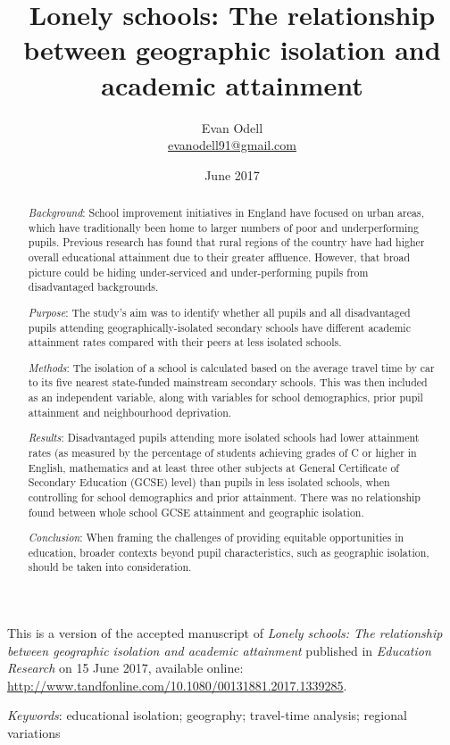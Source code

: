 \documentclass[12pt, a4paper]{article}
\title{{\Huge Lonely schools: The relationship between geographic isolation and academic attainment}}
\author{Evan Odell \\ \href{mailto: evanodell91@gmail.com}{evanodell91@gmail.com}}
\date{June 2017}
\begin{document}
\maketitle

This is a version of the accepted manuscript of \emph{Lonely schools: The relationship between geographic isolation and academic attainment} published in \emph{Education Research} on 15 June 2017, available online: \url{http://www.tandfonline.com/10.1080/00131881.2017.1339285}.


\begin{abstract}
\noindent\emph{Background}: School improvement initiatives in England have focused on urban areas, which have traditionally been home to larger numbers of poor and underperforming pupils. Previous research has found that rural regions of the country have had higher overall educational attainment due to their greater affluence. However, that broad picture could be hiding under-serviced and under-performing pupils from disadvantaged backgrounds.
	 
\noindent\emph{Purpose}: The study's aim was to identify whether all pupils and all disadvantaged pupils attending geographically-isolated secondary schools have different academic attainment rates compared with their peers at less isolated schools. 
	
\noindent\emph{Methods}: The isolation of a school is calculated based on the average travel time by car to its five nearest state-funded mainstream secondary schools. This was then included as an independent variable, along with variables for school demographics, prior pupil attainment and neighbourhood deprivation. 
	
\noindent\emph{Results}: Disadvantaged pupils attending more isolated schools had lower attainment rates (as measured by the percentage of students achieving grades of C or higher in English, mathematics and at least three other subjects at General Certificate of Secondary Education (GCSE) level) than pupils in less isolated schools, when controlling for school demographics and prior attainment. There was no relationship found between whole school GCSE attainment and geographic isolation. 
	
\noindent\emph{Conclusion}: When framing the challenges of providing equitable opportunities in education, broader contexts beyond pupil characteristics, such as geographic isolation, should be taken into consideration.
\end{abstract}

\emph{Keywords}: educational isolation; geography; travel-time analysis; regional variations
	
\end{document}
